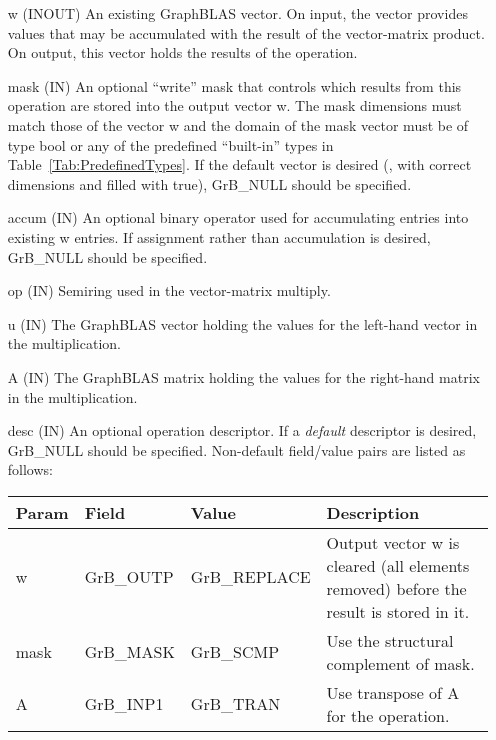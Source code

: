 \begin{itemize}[leftmargin=1.1in]
    \item[{\sf w}]    ({\sf INOUT}) An existing GraphBLAS vector.  On input,
    the vector provides values that may be accumulated with the result of the
    vector-matrix product.  On output, this vector holds the results of the
    operation.

    \item[{\sf mask}] ({\sf IN}) An optional ``write'' mask that controls which
    results from this operation are stored into the output vector {\sf w}. The 
    mask dimensions must match those of the vector {\sf w} and the domain of the
    {\sf mask} vector must be of type {\sf bool} or any of the predefined 
    ``built-in'' types in Table~\ref{Tab:PredefinedTypes}.  If the default
    vector is desired (\ie, with correct dimensions and filled with {\sf true}), 
    {\sf GrB\_NULL} should be specified.

    \item[{\sf accum}] ({\sf IN}) An optional binary operator used for accumulating
    entries into existing {\sf w} entries.
    If assignment rather than accumulation is
    desired, {\sf GrB\_NULL} should be specified.

    \item[{\sf op}]   ({\sf IN}) Semiring used in the vector-matrix
    multiply.

    \item[{\sf u}]    ({\sf IN}) The GraphBLAS vector holding the values for
    the left-hand vector in the multiplication.

    \item[{\sf A}]    ({\sf IN}) The GraphBLAS matrix holding the values
    for the right-hand matrix in the multiplication.

    \item[{\sf desc}] ({\sf IN}) An optional operation descriptor. If
    a \emph{default} descriptor is desired, {\sf GrB\_NULL} should be
    specified. Non-default field/value pairs are listed as follows:  \\

    \begin{tabular}{lllp{2.5in}}
        Param & Field  & Value & Description \\
        \hline
        {\sf w}    & {\sf GrB\_OUTP} & {\sf GrB\_REPLACE} & Output vector {\sf w}
        is cleared (all elements removed) before the result is stored in it.\\

        {\sf mask} & {\sf GrB\_MASK} & {\sf GrB\_SCMP}   & Use the structural
        complement of {\sf mask}. \\

        {\sf A}    & {\sf GrB\_INP1} & {\sf GrB\_TRAN}   & Use transpose of {\sf A}
        for the operation. \\
    \end{tabular}
\end{itemize}

